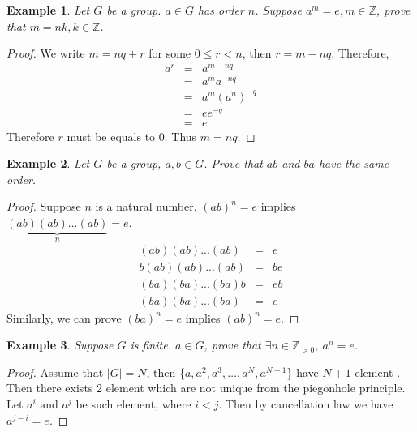 \documentclass{article}
\theoremstyle{MyNonumberplain}
\theoremstyle{break}
\newtheorem*{proof}{Proof. }
\newcommand{\Z}{\mathbb{Z}}
\newcommand{\infixand}{\text{ and }}
\theoremstyle{break}
\newtheorem{example}{Example}[section]
\theoremstyle{break}
\theoremstyle{definition}
\theoremstyle{break}
\begin{document}
\begin{expbox}
    \begin{example}
        Let $G$ be a group. $a\in G$ has order $n$. Suppose $a^m=e,m\in\Z$, prove that $m=nk,k\in\Z$.
    \end{example}    
    \begin{prfbox}
        \begin{proof}
            We write $m=nq+r$ for some $0\leq r < n$, then $r=m-nq$. Therefore, 
            \begin{eqnarray*}
                a^r & = & a^{m-nq}\\
                    & = & a^ma^{-nq}\\
                    & = & a^m(a^n)^{-q}\\
                    & = & ee^{-q}\\
                    & = & e
            \end{eqnarray*}
            Therefore $r$ must be equals to $0$. Thus $m=nq$.
        \end{proof}
    \end{prfbox}
\end{expbox}

\begin{expbox}
    \begin{example}
        Let $G$ be a group, $a,b\in G$. Prove that $ab$ and $ba$ have the same order.
    \end{example}
    \begin{prfbox}
        \begin{proof}
            Suppose $n$ is a natural number. $(ab)^n=e$ implies $\underbrace{(ab)(ab)...(ab)}_{n}=e$. 
            \begin{eqnarray*}
                (ab)(ab)...(ab) & = & e\\
               b(ab)(ab)...(ab) & = & be\\
               (ba)(ba)...(ba)b & = & eb\\
                (ba)(ba)...(ba) & = & e
            \end{eqnarray*}
            Similarly, we can prove $(ba)^n=e$ implies $(ab)^n=e$.
        \end{proof}
    \end{prfbox}
\end{expbox}

\begin{expbox}
    \begin{example}
        Suppose $G$ is finite. $a \in G$, prove that $\exists n \in \mathbb{Z}_{> 0}$, $a^n = e$.
    \end{example}
    \begin{prfbox}
        \begin{proof}
            Assume that $| G | = N$, then  \{$a, a^2, a^3, \ldots, a^N, a^{N + 1}$\}  have
        $N + 1$ element . Then there exists 2 element which are not unique from the
        piegonhole principle. Let $a^i \infixand a^j$ be such element, where $i < j$.
        Then by cancellation law we have $a^{j - i} = e$.
        \end{proof}
    \end{prfbox}
\end{expbox}
\end{document}
